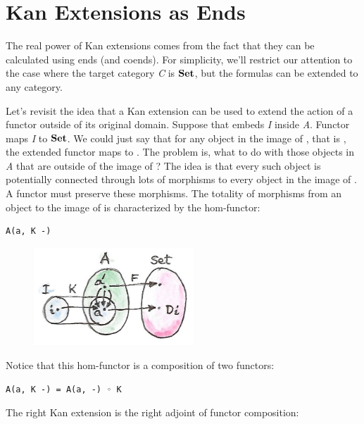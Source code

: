 \section{Kan Extensions as Ends}\label{kan-extensions-as-ends}

The real power of Kan extensions comes from the fact that they can be
calculated using ends (and coends). For simplicity, we'll restrict our
attention to the case where the target category \emph{C} is
$\mathbf{Set}$, but the formulas can be extended to any category.

Let's revisit the idea that a Kan extension can be used to extend the
action of a functor outside of its original domain. Suppose that
 embeds \emph{I} inside \emph{A}. Functor  maps
\emph{I} to $\mathbf{Set}$. We could just say that for any object
 in the image of , that is , the
extended functor maps  to . The problem is, what
to do with those objects in \emph{A} that are outside of the image of
? The idea is that every such object is potentially connected
through lots of morphisms to every object in the image of . A
functor must preserve these morphisms. The totality of morphisms from an
object  to the image of  is characterized by the
hom-functor:

\begin{Verbatim}[commandchars=\\\{\}]
A(a, K -)
\end{Verbatim}

\begin{figure}[H]
\centering
\includegraphics[width=60mm]{images/kan13.jpg}
\end{figure}

\noindent
Notice that this hom-functor is a composition of two functors:

\begin{Verbatim}[commandchars=\\\{\}]
A(a, K -) = A(a, -) ◦ K
\end{Verbatim}
The right Kan extension is the right adjoint of functor composition:


